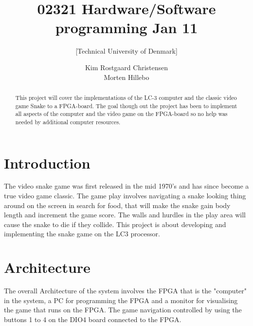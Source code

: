 \documentclass{acm_proc_article-sp}
\begin{document}
\title{02321 Hardware/Software programming Jan 11}
\subtitle{[Technical University of Denmark]
}

\author{
\alignauthor 
Kim Rostgaard Christensen\\
\alignauthor 
Morten Hillebo
}




\begin{abstract}
This project will cover the implementations of the LC-3 computer and the classic video game Snake to a FPGA-board. 
The goal though out the project has been to implement all aspects of the computer and the video game on the FPGA-board so no help was needed by additional computer resources.
\end{abstract}

\section{Introduction}
\label{sec:introduction}

The video snake game was first released in the mid 1970's and has since become a true video game classic. The game play involves navigating a snake looking thing around on the screen in search for food, that will make the snake gain body length and increment the game score. 
The walls and hurdles in the play area will cause the snake to die if they collide.
This project is about developing and implementing the snake game on the LC3 processor. 
%

\section{Architecture}
The overall Architecture of the system involves the FPGA that is the "computer" in the system, a PC for programming the FPGA and a monitor for visualising the game that runs on the FPGA. The game navigation controlled by using the buttons 1 to 4 on the DIO4 board connected to the FPGA.
\end{document}
